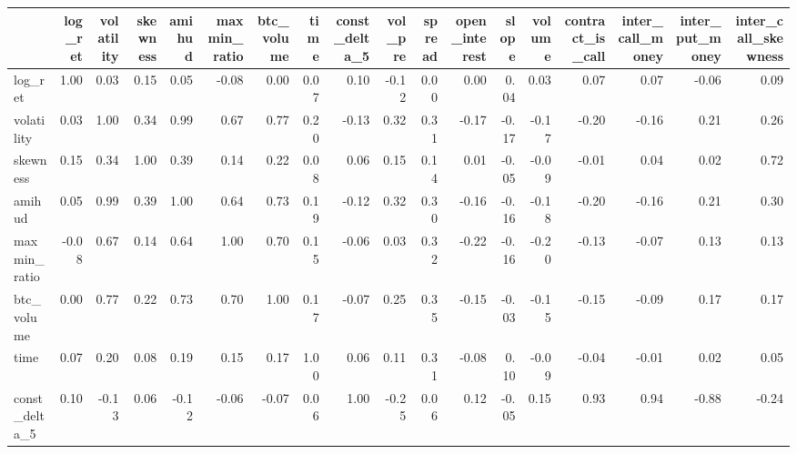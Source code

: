 \begin{tabular}{lrrrrrrrrrrrrrrrrr}
\toprule
{} &  log\_ret &  volatility &  skewness &  amihud &  maxmin\_ratio &  btc\_volume &  time &  const\_delta\_5 &  vol\_pre &  spread &  open\_interest &  slope &  volume &  contract\_is\_call &  inter\_call\_money &  inter\_put\_money &  inter\_call\_skewness \\
\midrule
log\_ret             &     1.00 &        0.03 &      0.15 &    0.05 &         -0.08 &        0.00 &  0.07 &           0.10 &    -0.12 &    0.00 &           0.00 &   0.04 &    0.03 &              0.07 &              0.07 &            -0.06 &                 0.09 \\
volatility          &     0.03 &        1.00 &      0.34 &    0.99 &          0.67 &        0.77 &  0.20 &          -0.13 &     0.32 &    0.31 &          -0.17 &  -0.17 &   -0.17 &             -0.20 &             -0.16 &             0.21 &                 0.26 \\
skewness            &     0.15 &        0.34 &      1.00 &    0.39 &          0.14 &        0.22 &  0.08 &           0.06 &     0.15 &    0.14 &           0.01 &  -0.05 &   -0.09 &             -0.01 &              0.04 &             0.02 &                 0.72 \\
amihud              &     0.05 &        0.99 &      0.39 &    1.00 &          0.64 &        0.73 &  0.19 &          -0.12 &     0.32 &    0.30 &          -0.16 &  -0.16 &   -0.18 &             -0.20 &             -0.16 &             0.21 &                 0.30 \\
maxmin\_ratio        &    -0.08 &        0.67 &      0.14 &    0.64 &          1.00 &        0.70 &  0.15 &          -0.06 &     0.03 &    0.32 &          -0.22 &  -0.16 &   -0.20 &             -0.13 &             -0.07 &             0.13 &                 0.13 \\
btc\_volume          &     0.00 &        0.77 &      0.22 &    0.73 &          0.70 &        1.00 &  0.17 &          -0.07 &     0.25 &    0.35 &          -0.15 &  -0.03 &   -0.15 &             -0.15 &             -0.09 &             0.17 &                 0.17 \\
time                &     0.07 &        0.20 &      0.08 &    0.19 &          0.15 &        0.17 &  1.00 &           0.06 &     0.11 &    0.31 &          -0.08 &   0.10 &   -0.09 &             -0.04 &             -0.01 &             0.02 &                 0.05 \\
const\_delta\_5       &     0.10 &       -0.13 &      0.06 &   -0.12 &         -0.06 &       -0.07 &  0.06 &           1.00 &    -0.25 &    0.06 &           0.12 &  -0.05 &    0.15 &              0.93 &              0.94 &            -0.88 &                -0.24 \\

\end{tabular}
